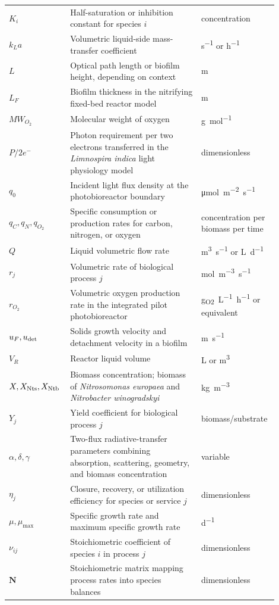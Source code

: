 \documentclass[11pt]{article}
\newcommand{\Limno}{\textit{Limnospira indica}}
\newcommand{\Nts}{\textit{Nitrosomonas europaea}}
\newcommand{\Ntb}{\textit{Nitrobacter winogradskyi}}
\begin{document}
\begin{longtable}{P{0.18\linewidth}P{0.47\linewidth}P{0.25\linewidth}}
$K_i$ & Half-saturation or inhibition constant for species $i$ & concentration\\
$k_La$ & Volumetric liquid-side mass-transfer coefficient & \si{s^{-1}} or \si{h^{-1}}\\
$L$ & Optical path length or biofilm height, depending on context & \si{m}\\
$L_F$ & Biofilm thickness in the nitrifying fixed-bed reactor model & \si{m}\\
$MW_{O_2}$ & Molecular weight of oxygen & \si{g.mol^{-1}}\\
$P/2e^-$ & Photon requirement per two electrons transferred in the \Limno{} light physiology model & dimensionless\\
$q_0$ & Incident light flux density at the photobioreactor boundary & \si{\micro mol.m^{-2}.s^{-1}}\\
$q_C,q_N,q_{O_2}$ & Specific consumption or production rates for carbon, nitrogen, or oxygen & concentration per biomass per time\\
$Q$ & Liquid volumetric flow rate & \si{m^3.s^{-1}} or \si{L.d^{-1}}\\
$r_j$ & Volumetric rate of biological process $j$ & \si{mol.m^{-3}.s^{-1}}\\
$r_{O_2}$ & Volumetric oxygen production rate in the integrated pilot photobioreactor & \si{g_{O2}.L^{-1}.h^{-1}} or equivalent\\
$u_F,u_{\rm det}$ & Solids growth velocity and detachment velocity in a biofilm & \si{m.s^{-1}}\\
$V_R$ & Reactor liquid volume & \si{L} or \si{m^3}\\
$X, X_{\rm Nts}, X_{\rm Ntb}$ & Biomass concentration; biomass of \Nts{} and \Ntb{} & \si{kg.m^{-3}}\\
$Y_j$ & Yield coefficient for biological process $j$ & biomass/substrate\\
$\alpha,\delta,\gamma$ & Two-flux radiative-transfer parameters combining absorption, scattering, geometry, and biomass concentration & variable\\
$\eta_j$ & Closure, recovery, or utilization efficiency for species or service $j$ & dimensionless\\
$\mu,\mu_{\max}$ & Specific growth rate and maximum specific growth rate & \si{d^{-1}}\\
$\nu_{ij}$ & Stoichiometric coefficient of species $i$ in process $j$ & dimensionless\\
$\bm N$ & Stoichiometric matrix mapping process rates into species balances & dimensionless\\
\bottomrule
\end{longtable}
\end{document}
